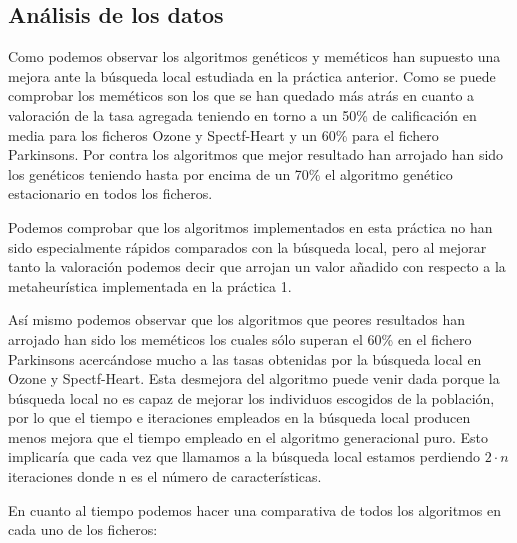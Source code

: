 \documentclass[12pt,a4paper]{article}
\begin{document}
	\newpage
	
	\subsection{Análisis de los datos}
	
	Como podemos observar los algoritmos genéticos y meméticos han supuesto una mejora ante la búsqueda local estudiada en la práctica anterior. Como se puede comprobar los meméticos son los que se han quedado más atrás en cuanto a valoración de la tasa agregada teniendo en torno a un 50\% de calificación en media para los ficheros Ozone y Spectf-Heart y un 60\% para el fichero Parkinsons. Por contra los algoritmos que mejor resultado han arrojado han sido los genéticos teniendo hasta por encima de un 70\% el algoritmo genético estacionario en todos los ficheros. 
	
	Podemos comprobar que los algoritmos implementados en esta práctica no han sido especialmente rápidos comparados con la búsqueda local, pero al mejorar tanto la valoración podemos decir que arrojan un valor añadido con respecto a la metaheurística implementada en la práctica 1.
	
	Así mismo podemos observar que los algoritmos que peores resultados han arrojado han sido los meméticos los cuales sólo superan el 60\% en el fichero Parkinsons acercándose mucho a las tasas obtenidas por la búsqueda local en Ozone y Spectf-Heart. Esta desmejora del algoritmo puede venir dada porque la búsqueda local no es capaz de mejorar los individuos escogidos de la población, por lo que el tiempo e iteraciones empleados en la búsqueda local producen menos mejora que el tiempo empleado en el algoritmo generacional puro. Esto implicaría que cada vez que llamamos a la búsqueda local estamos perdiendo $2\cdot n$ iteraciones donde n es el número de características.
	
	En cuanto al tiempo podemos hacer una comparativa de todos los algoritmos en cada uno de los ficheros:
	
\end{document}
